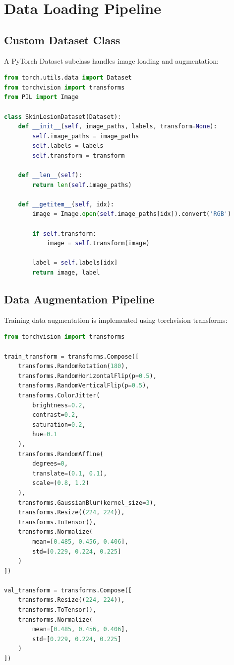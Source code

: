 \section{Data Loading Pipeline}

\subsection{Custom Dataset Class}

A PyTorch Dataset subclass handles image loading and augmentation:

\begin{lstlisting}[language=Python, caption=Custom Dataset Implementation]
from torch.utils.data import Dataset
from torchvision import transforms
from PIL import Image

class SkinLesionDataset(Dataset):
    def __init__(self, image_paths, labels, transform=None):
        self.image_paths = image_paths
        self.labels = labels
        self.transform = transform
    
    def __len__(self):
        return len(self.image_paths)
    
    def __getitem__(self, idx):
        image = Image.open(self.image_paths[idx]).convert('RGB')
        
        if self.transform:
            image = self.transform(image)
        
        label = self.labels[idx]
        return image, label
\end{lstlisting}

\subsection{Data Augmentation Pipeline}

Training data augmentation is implemented using torchvision transforms:

\begin{lstlisting}[language=Python, caption=Training Augmentation Pipeline]
from torchvision import transforms

train_transform = transforms.Compose([
    transforms.RandomRotation(180),
    transforms.RandomHorizontalFlip(p=0.5),
    transforms.RandomVerticalFlip(p=0.5),
    transforms.ColorJitter(
        brightness=0.2,
        contrast=0.2,
        saturation=0.2,
        hue=0.1
    ),
    transforms.RandomAffine(
        degrees=0,
        translate=(0.1, 0.1),
        scale=(0.8, 1.2)
    ),
    transforms.GaussianBlur(kernel_size=3),
    transforms.Resize((224, 224)),
    transforms.ToTensor(),
    transforms.Normalize(
        mean=[0.485, 0.456, 0.406],
        std=[0.229, 0.224, 0.225]
    )
])

val_transform = transforms.Compose([
    transforms.Resize((224, 224)),
    transforms.ToTensor(),
    transforms.Normalize(
        mean=[0.485, 0.456, 0.406],
        std=[0.229, 0.224, 0.225]
    )
])
\end{lstlisting}

